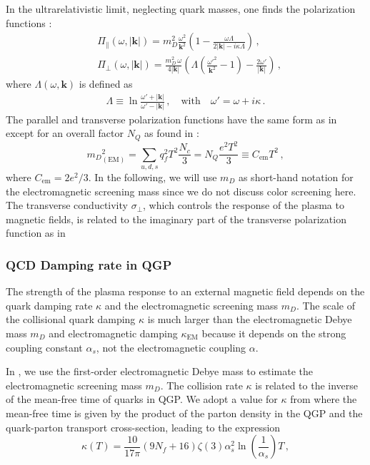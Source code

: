 In the ultrarelativistic limit, neglecting quark masses, one finds the polarization functions \cite{Formanek:2021blc}:
\begin{align}\label{eq:polfuncsUltra}
&\Pi_{\parallel}(\omega,|\boldsymbol{k}|) = m_D^2\frac{\omega^2}{\boldsymbol{k}^2}\left(1 - \frac{\omega \Lambda}{2|\boldsymbol{k}|-i\kappa \Lambda}\right)\,,\\
&\Pi_{\perp}(\omega,|\boldsymbol{k}|) = \frac{m_D^2\,\omega}{4 |\boldsymbol{k}|}\left( \Lambda \left(\frac{\omega'^2}{\boldsymbol{k}^2} - 1\right) - \frac{2\omega'}{ |\boldsymbol{k}|}\right)\,,
\end{align}
where $\Lambda(\omega,\boldsymbol{k})$ is defined as
\begin{align}\label{eq:definitions}
 \Lambda \equiv \ln \frac{\omega'+  |\boldsymbol{k}|}{\omega'- |\boldsymbol{k}|}\,, \quad \text{with} \quad \omega' = \omega+i\kappa\,.
\end{align}
The parallel and transverse polarization functions have the same form as in \cite{Formanek:2021blc} except for an overall factor $N_Q$  as found in \cite{Kapusta:1992fm,Grayson:2022asf}:
\begin{equation}\label{eq:DebyemQCD}
    {m_D}^2_{(\text{EM})} = \sum_{u,d,s} q^2_f T^2 \frac{N_c}{3} = N_Q\frac{e^2T^2}{3} \equiv C_{\text{em}}T^2\,,
\end{equation}
where $C_{\text{em}} =  2e^2/3$. In the following, we will use $m_D$ as short-hand notation for the electromagnetic screening mass since we do not discuss color screening here.
The transverse conductivity $\sigma_{\perp}$, which controls the response of the plasma to magnetic fields, is related to the imaginary part of the transverse polarization function as in 



\subsubsection{QCD Damping rate in QGP}

The strength of the plasma response to an external magnetic field depends on the quark damping rate $\kappa$ and the electromagnetic screening mass $m_D$. The scale of the collisional quark damping $\kappa$ is much larger than the electromagnetic Debye mass $m_D$ and electromagnetic damping $\kappa_{\text{EM}}$ because it depends on the strong coupling constant $\alpha_s$, not the electromagnetic coupling $\alpha$.

In \cite{Grayson:2022asf}, we use the first-order electromagnetic Debye mass  to estimate the electromagnetic screening mass $m_D$. The collision rate $\kappa$ is related to the inverse of the mean-free time of quarks in QGP. We adopt a value for $\kappa$ from \cite{Mrowczynski:1988xu} where the mean-free time is given by the product of the parton density in the QGP and the quark-parton transport cross-section, leading to the expression 
\begin{equation}\label{eq:kappadef}
    \kappa(T) = \frac{10}{17\pi} (9 N_f +16) \zeta(3) \alpha_s^2 \ln\left(\frac{1}{\alpha_s}\right) T\,,
\end{equation}

